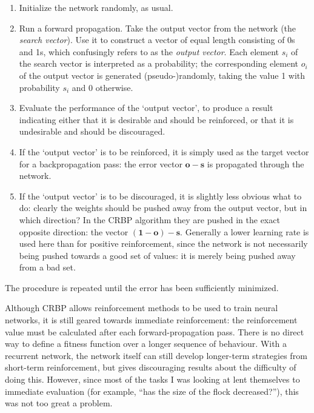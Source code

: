 \documentclass[a4paper]{report}
\begin{document}
\begin{enumerate}
  
\item Initialize the network randomly, as usual.
  
\item Run a forward propagation. Take the output vector from the
  network (the \emph{search vector}). Use it to construct a vector of
  equal length consisting of 0s and 1s, which \cite{ackley90} confusingly
  refers to as the \emph{output vector}. Each element $s_i$ of the
  search vector is interpreted as a probability; the corresponding
  element $o_i$ of the output vector is generated (pseudo-)randomly,
  taking the value 1 with probability $s_i$ and 0 otherwise.
  
\item Evaluate the performance of the `output vector', to produce a
  result indicating either that it is desirable and should be
  reinforced, or that it is undesirable and should be discouraged.
  
\item If the `output vector' is to be reinforced, it is simply used as
  the target vector for a backpropagation pass: the error vector
  $\mathbf{o} - \mathbf{s}$ is propagated through the network.
  
\item If the `output vector' is to be discouraged, it is slightly less
  obvious what to do: clearly the weights should be pushed away from
  the output vector, but in which direction? In the CRBP algorithm
  they are pushed in the exact opposite direction: the vector
  $\mathbf{(1-o)-s}$. Generally a lower learning rate is used here
  than for positive reinforcement, since the network is not
  necessarily being pushed towards a good set of values: it is merely
  being pushed away from a bad set.

\end{enumerate}

The procedure is repeated until the error has been
sufficiently minimized.

Although CRBP allows reinforcement methods to be used to train neural
networks, it is still geared towards immediate reinforcement: the
reinforcement value must be calculated after each forward-propagation
pass. There is no direct way to define a fitness function over a
longer sequence of behaviour. With a recurrent network, the network
itself can still develop longer-term strategies from short-term
reinforcement, but \cite{meeden96} gives discouraging results about
the difficulty of doing this. However, since most of the tasks I was
looking at lent themselves to immediate evaluation (for example, ``has
the size of the flock decreased?''), this was not too great a problem.
\end{document}
